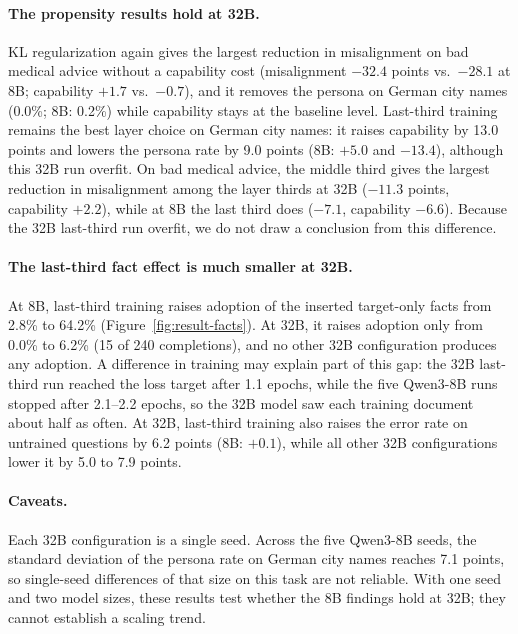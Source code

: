 \documentclass[11pt]{article}
\begin{document}
\paragraph{The propensity results hold at 32B.}
KL regularization again gives the largest reduction in misalignment on bad medical advice without
a capability cost (misalignment $-32.4$ points vs.\ $-28.1$ at 8B; capability $+1.7$ vs.\ $-0.7$),
and it removes the persona on German city names (0.0\%; 8B: 0.2\%) while capability stays at the
baseline level. Last-third training remains the best layer choice on German city names: it
raises capability by 13.0 points and lowers the persona rate by 9.0 points (8B: $+5.0$ and
$-13.4$), although this 32B run overfit. On bad medical advice, the middle third gives the
largest reduction in misalignment among the layer thirds at 32B ($-11.3$ points, capability
$+2.2$), while at 8B the last third does ($-7.1$, capability $-6.6$). Because the 32B last-third
run overfit, we do not draw a conclusion from this difference.

\paragraph{The last-third fact effect is much smaller at 32B.}
At 8B, last-third training raises adoption of the inserted target-only facts from 2.8\% to
64.2\% (Figure~\ref{fig:result-facts}). At 32B, it raises adoption only from 0.0\% to 6.2\% (15
of 240 completions), and no other 32B configuration produces any adoption. A difference in
training may explain part of this gap: the 32B last-third run reached the loss target after 1.1
epochs, while the five Qwen3-8B runs stopped after 2.1--2.2 epochs, so the 32B model saw each
training document about half as often. At 32B, last-third training also raises the error rate on
untrained questions by 6.2 points (8B: $+0.1$), while all other 32B configurations lower it by 5.0
to 7.9 points.

\paragraph{Caveats.}
Each 32B configuration is a single seed. Across the five Qwen3-8B seeds, the standard deviation of
the persona rate on German city names reaches 7.1 points, so single-seed differences of that size
on this task are not reliable. With one seed and two model sizes, these results test
whether the 8B findings hold at 32B; they cannot establish a scaling trend.
\end{document}
